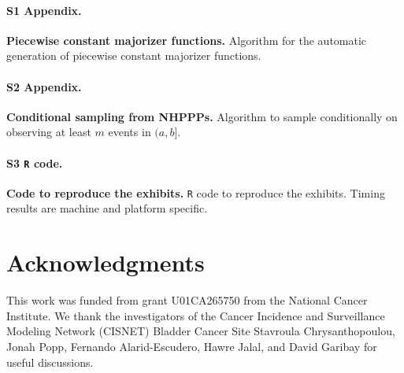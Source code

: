 \documentclass[10pt,letterpaper]{article}
\newcommand{\proglang}[1]{\texttt{#1}}
\begin{document}
\paragraph*{S1 Appendix.}
\label{S1_Appendix}
{\bf Piecewise constant majorizer functions.} Algorithm for the automatic generation of piecewise constant majorizer functions.

\paragraph*{S2 Appendix.}
\label{S2_Appendix}
{\bf Conditional sampling from NHPPPs.} Algorithm to sample conditionally on observing at least $m$ events in $(a, b]$.

\paragraph*{S3 \proglang{R} code.}
\label{S3_Code}
{\bf Code to reproduce the exhibits.} \proglang{R} code to reproduce the exhibits. Timing results are machine and platform specific.


\section*{Acknowledgments}
This work was funded from grant U01CA265750 from the National Cancer Institute.
We thank the investigators of the Cancer Incidence and Surveillance Modeling Network (CISNET)
Bladder Cancer Site Stavroula Chrysanthopoulou, Jonah Popp, Fernando Alarid-Escudero,
Hawre Jalal, and David Garibay for useful discussions.

\nolinenumbers
\end{document}
